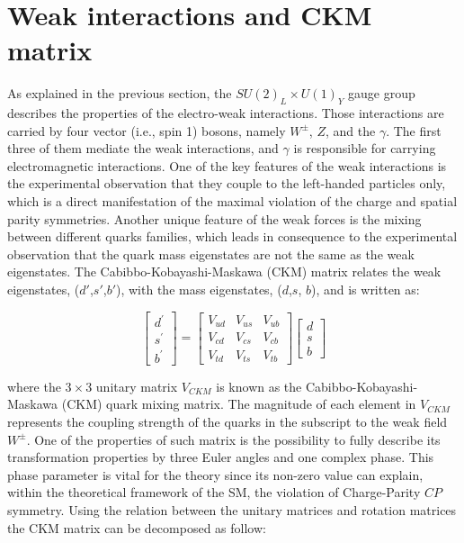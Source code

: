 \section{Weak interactions and CKM matrix}

As explained in the previous section, the $ SU(2)_L \times U(1)_Y$ gauge group describes the properties of the electro-weak interactions. Those interactions are carried by four vector (i.e., spin 1) bosons, namely $W^{\pm}$, $Z$, and the $\gamma$.  The first three of them mediate the weak interactions, and $\gamma$ is responsible for carrying electromagnetic interactions. One of the key features of the weak interactions is the experimental observation that they couple to the left-handed particles only, which is a direct manifestation of the maximal violation of the charge and spatial parity symmetries. Another unique feature of the weak forces is the mixing between different quarks families, which leads in consequence to the experimental observation that the quark mass eigenstates are not the same as the weak eigenstates. The Cabibbo-Kobayashi-Maskawa (CKM) matrix relates the weak eigenstates,  ($d\prime$,$s\prime$,$b\prime$), with the mass eigenstates, ($d$,$s$, $b$), and is written as:

\begin{equation}
\label{eq:ckm}
  \begin{bmatrix}  d^\prime  \\  s^\prime  \\  b^\prime  \end{bmatrix} = \begin{bmatrix} V_{ud} & V_{us} & V_{ub} \\ V_{cd} & V_{cs} & V_{cb} \\ V_{td} & V_{ts} & V_{tb} \end{bmatrix} \begin{bmatrix}  d  \\  s  \\  b  \end{bmatrix}
\end{equation}

where the $3 \times 3$ unitary matrix $V_{CKM}$ is known as the Cabibbo-Kobayashi-Maskawa (CKM) quark mixing matrix\cite{ckm1}\cite{ckm2}. The magnitude of each element in $V_{CKM}$ represents the coupling strength of the quarks in the subscript to the weak field $W^{\pm}$.  One of the properties of such matrix is the possibility to fully describe its transformation properties by three Euler angles and one complex phase. This phase parameter is vital for the theory since its non-zero value can explain, within the theoretical framework of the SM, the violation of Charge-Parity $CP$ symmetry. Using the relation between the unitary matrices and rotation matrices the CKM matrix can be decomposed as follow:

